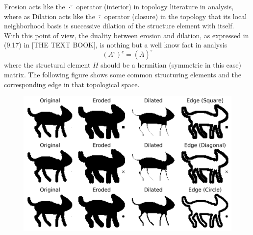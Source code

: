 \documentclass[11pt,a4paper]{article}
\theoremstyle{definition}
\theoremstyle{remark}
\begin{document}
	Erosion acts like the $\cdot^\circ$ operator (interior) in topology literature in analysis, where as Dilation acts like the $\overline{\cdot}$ operator (closure) in the topology that its local neighborhood basis is successive dilation of the structure element with itself. With this point of view, the duality between erosion and dilation, as expressed in (9.17) in [THE TEXT BOOK], is nothing but a well know fact in analysis
	\[ (A^\circ)^c = (\overline{A})^\circ \]
	where  the structural element $ H $ should be a hermitian (symmetric in this case) matrix. The following figure shows some common structuring elements and the corresponding edge in that topological space.
	
	\begin{figure}[h!]
		\centering
		\includegraphics[width=0.5\linewidth]{images/all_kernels_results}

		\label{fig:allkernelsresults}
	\end{figure}
	\FloatBarrier
	
	
	
	
	
	
\end{document}
